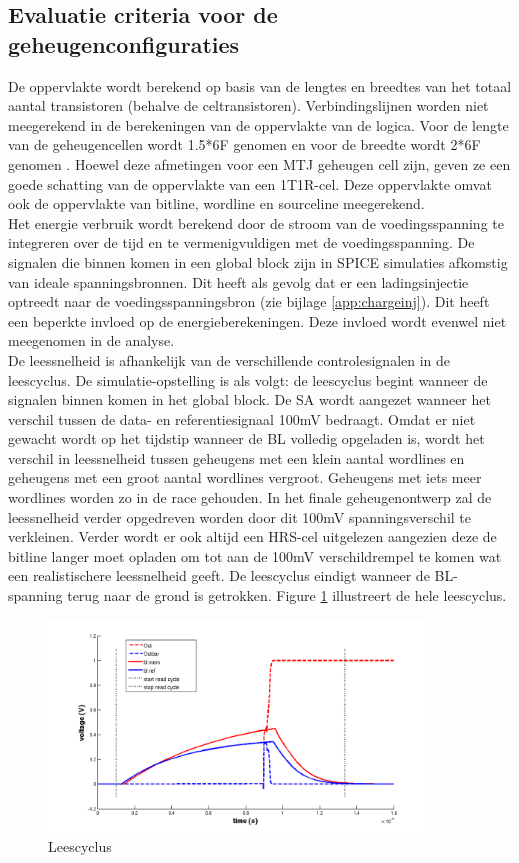 \subsection{Evaluatie criteria voor de geheugenconfiguraties}
De oppervlakte wordt berekend op basis van de lengtes en breedtes van het totaal aantal transistoren (behalve de celtransistoren). Verbindingslijnen worden niet meegerekend in de berekeningen van de oppervlakte van de logica. Voor de lengte van de geheugencellen wordt 1.5*6F genomen en voor de breedte wordt 2*6F genomen \cite{ppt:cosemans}. Hoewel deze afmetingen voor een MTJ geheugen cell zijn, geven ze een goede schatting van de oppervlakte van een 1T1R-cel. Deze oppervlakte omvat ook de oppervlakte van bitline, wordline en sourceline meegerekend. \\
Het energie verbruik wordt berekend door de stroom van de voedingsspanning te integreren over de tijd en te vermenigvuldigen met de voedingsspanning. De signalen die binnen komen in een global block zijn in SPICE simulaties afkomstig van ideale spanningsbronnen. Dit heeft als gevolg dat er een ladingsinjectie optreedt naar de voedingsspanningsbron (zie bijlage \ref{app:chargeinj}). Dit heeft een beperkte invloed op de energieberekeningen. Deze invloed wordt evenwel niet meegenomen in de analyse. \\
De leessnelheid is afhankelijk van de verschillende controlesignalen in de leescyclus. De simulatie-opstelling is als volgt: de leescyclus begint wanneer de signalen binnen komen in het global block. De SA wordt aangezet wanneer het verschil tussen de data- en referentiesignaal 100mV bedraagt. Omdat er niet gewacht wordt op het tijdstip wanneer de BL volledig opgeladen is, wordt het verschil in leessnelheid tussen geheugens met een klein aantal wordlines en geheugens met een groot aantal wordlines vergroot. Geheugens met iets meer wordlines worden zo in de race gehouden. In het finale geheugenontwerp zal de leessnelheid verder opgedreven worden door dit 100mV spanningsverschil te verkleinen. Verder wordt er ook altijd een HRS-cel uitgelezen aangezien deze de bitline langer moet opladen om tot aan de 100mV verschildrempel te komen wat een realistischere leessnelheid geeft. De leescyclus eindigt wanneer de BL-spanning terug naar de grond is getrokken. Figure \ref{fig:leescyclus} illustreert de hele leescyclus.

\begin{figure}[!ht]
  \centering
  \includegraphics[width=0.9\textwidth]{../fig/hfdstk-timing-leescyclus.png}
  \caption[Leescyclus]{Leescyclus}
  \label{fig:leescyclus}
\end{figure} 

